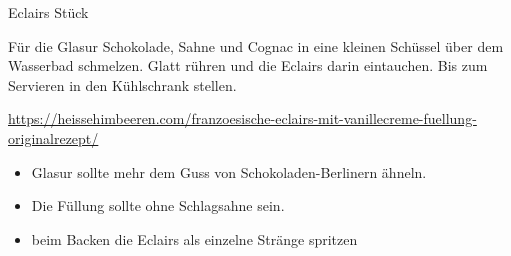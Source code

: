 \begin{MyRecipe}{Eclairs}{ Stück}{}
	
	Für die Glasur Schokolade, Sahne und Cognac in eine kleinen Schüssel über dem Wasserbad schmelzen. Glatt rühren und die Eclairs darin eintauchen. Bis zum Servieren in den Kühlschrank stellen.\par\bigskip
	
	\url{https://heissehimbeeren.com/franzoesische-eclairs-mit-vanillecreme-fuellung-originalrezept/}
	
	\begin{itemize}
		\item Glasur sollte mehr dem Guss von Schokoladen-Berlinern ähneln. 
		\item Die Füllung sollte ohne Schlagsahne sein.
		\item beim Backen die Eclairs als einzelne Stränge spritzen
	\end{itemize}

	
	
\end{MyRecipe}